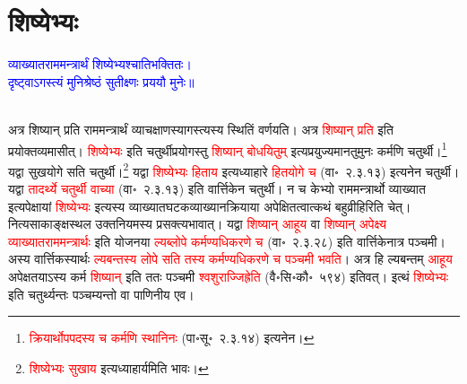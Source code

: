 \section[शिष्येभ्यः]{शिष्येभ्यः}
\centering\textcolor{blue}{व्याख्यातराममन्त्रार्थं शिष्येभ्यश्चातिभक्तितः।\nopagebreak\\
दृष्ट्वाऽगस्त्यं मुनिश्रेष्ठं सुतीक्ष्णः प्रययौ मुनेः॥}\nopagebreak\\
\\
\begin{sloppypar}\justifying\noindent\hspace{10mm} अत्र शिष्यान् प्रति राम\-मन्त्रार्थं व्याचक्षाणस्यागस्त्यस्य स्थितिं वर्णयति। अत्र \textcolor{red}{शिष्यान् प्रति} इति प्रयोक्तव्यमासीत्। \textcolor{red}{शिष्येभ्यः} इति चतुर्थी\-प्रयोगस्तु \textcolor{red}{शिष्यान् बोधयितुम्‌} इत्यप्रयुज्यमान\-तुमुनः कर्मणि चतुर्थी।\footnote{\textcolor{red}{क्रियार्थोप\-पदस्य च कर्मणि स्थानिनः} (पा॰सू॰~२.३.१४) इत्यनेन।} यद्वा सुख\-योगे सति चतुर्थी।\footnote{\textcolor{red}{शिष्येभ्यः सुखाय} इत्यध्याहार्यमिति भावः।} यद्वा \textcolor{red}{शिष्येभ्यः हिताय} इत्यध्याहारे \textcolor{red}{हित\-योगे च} (वा॰~२.३.१३) इत्यनेन चतुर्थी। यद्वा \textcolor{red}{तादर्थ्ये चतुर्थी वाच्या} (वा॰~२.३.१३) इति वार्त्तिकेन चतुर्थी। न च केभ्यो राम\-मन्त्रार्थो व्याख्यात इत्यपेक्षायां \textcolor{red}{शिष्येभ्यः} इत्यस्य व्याख्यात\-घटक\-व्याख्यान\-क्रियाया अपेक्षितत्वात्कथं बहुव्रीहिरिति चेत्। नित्य\-साकाङ्क्ष\-स्थल उक्त\-नियमस्य प्रसक्त्यभावात्। यद्वा \textcolor{red}{शिष्यान् आहूय} वा \textcolor{red}{शिष्यान् अपेक्ष्य व्याख्यात\-राम\-मन्त्रार्थः} इति योजनया \textcolor{red}{ल्यब्लोपे कर्मण्यधिकरणे च} (वा॰~२.३.२८) इति वार्त्तिकेनात्र पञ्चमी। अस्य वार्त्तिकस्यार्थः \textcolor{red}{ल्यबन्तस्य लोपे सति तस्य कर्मण्यधिकरणे च पञ्चमी भवति}। अत्र हि ल्यबन्तम् \textcolor{red}{आहूय} अपेक्षतयाऽस्य कर्म \textcolor{red}{शिष्यान्‌} इति ततः पञ्चमी \textcolor{red}{श्वशुराज्जिह्रेति} (वै॰सि॰कौ॰~५९४) इतिवत्। इत्थं \textcolor{red}{शिष्येभ्यः} इति चतुर्थ्यन्तः पञ्चम्यन्तो वा पाणिनीय एव। \end{sloppypar}
